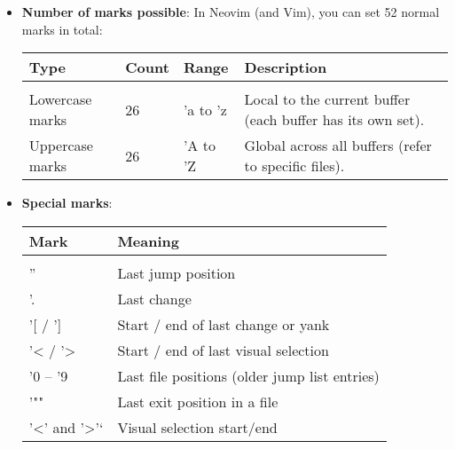 \documentclass{report}
\begin{document}
    \begin{itemize}
        \item \textbf{Number of marks possible}: In Neovim (and Vim), you can set 52 normal marks in total:
            \begin{center}
                \begin{tabular}{llll}
                    Type	&Count	&Range	&Description \\
                    \hline \\[0.01cm]
                    Lowercase marks	&26	&'a to 'z	&Local to the current buffer (each buffer has its own set). \\[2ex]
                    Uppercase marks	&26	&'A to 'Z	&Global across all buffers (refer to specific files).\\[2ex]
                \end{tabular}
            \end{center}
        \item \textbf{Special marks}:
            \begin{center}
                \begin{tabular}{ll}
                    Mark	&Meaning \\
                    \hline \\[0.01cm]
                    '' 	&Last jump position\\[2ex]
                    '.	&Last change\\[2ex]
                    '[ / ']	&Start / end of last change or yank\\[2ex]
                    '< / '>	&Start / end of last visual selection\\[2ex]
                    '0 – '9	&Last file positions (older jump list entries)\\[2ex]
                    '""	&Last exit position in a file\\[2ex]
                    '<' and '>'`	&Visual selection start/end
                \end{tabular}
            \end{center}
    \end{itemize}
    

























    
\end{document}
